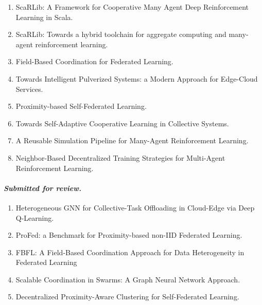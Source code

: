\documentclass[12pt]{article}
\begin{document}
\begin{enumerate}
	\item ScaRLib: A Framework for Cooperative Many Agent Deep Reinforcement 
	 Learning in Scala.~\cite{DBLP:conf/coordination/DominiCAV23}
	\item ScaRLib: Towards a hybrid toolchain for aggregate computing and many-agent 
	 reinforcement learning.~\cite{DBLP:journals/scp/DominiCAV24}
	\item Field-Based Coordination for Federated Learning.~\cite{DBLP:conf/coordination/DominiAEV24}
	\item Towards Intelligent Pulverized Systems: a Modern Approach 
	 for Edge-Cloud Services.~\cite{DBLP:conf/woa/DominiFAV24}
	\item Proximity-based Self-Federated Learning.~\cite{DBLP:journals/corr/abs-2407-12410}
	\item Towards Self-Adaptive Cooperative Learning in Collective Systems.~\cite{DBLP:conf/acsos/Domini24}
	\item A Reusable Simulation Pipeline for Many-Agent Reinforcement Learning.~\cite{DBLP:conf/dsrt/DominiAPV24}
	\item Neighbor-Based Decentralized Training Strategies for Multi-Agent 
	 Reinforcement Learning.~\cite{DBLP:conf/sac/MalucelliDAV25}
\end{enumerate}

\sloppypar
\paragraph{\emph{Submitted for review.}}
\begin{enumerate}
	\item Heterogeneous GNN for Collective-Task Offloading in Cloud-Edge via Deep
	 Q-Learning.~\cite{DBLP:journals/taas/FarabegoliDAV2025}
	\item ProFed: a Benchmark for Proximity-based non-IID Federated Learning.~\cite{DBLP:conf/ijcnn/DominiAV2025}
	\item FBFL: A Field-Based Coordination Approach for Data Heterogeneity in 
	 Federated Learning~\cite{domini2025fbflfieldbasedcoordinationapproach}
	\item Scalable Coordination in Swarms: A Graph Neural Network Approach.~\cite{DBLP:conf/coordination/VenturiniDAV2025}
	\item Decentralized Proximity-Aware Clustering for Self-Federated Learning.~\cite{DBLP:journals/iot/DominiAFVE2025}
\end{enumerate}


\end{document}
